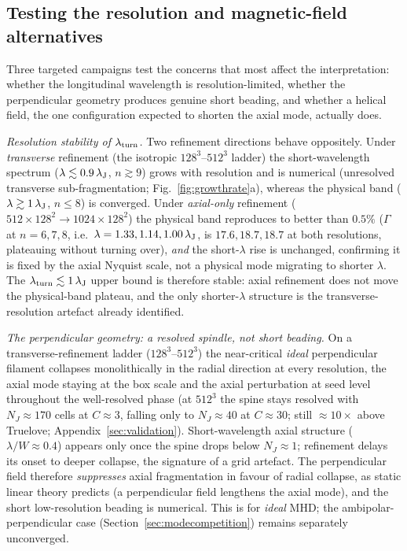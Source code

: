 \documentclass[usenatbib,twoside,twocolumn]{mnras}
\begin{document}
\subsection{Testing the resolution and magnetic-field alternatives}
\label{sec:optional_tests}
Three targeted campaigns test the concerns that most affect the interpretation: whether the longitudinal wavelength is resolution-limited, whether the perpendicular geometry produces genuine short beading, and whether a helical field, the one configuration expected to shorten the axial mode, actually does.

\emph{Resolution stability of $\lambda_{\rm turn}$.} Two refinement directions behave oppositely. Under \emph{transverse} refinement (the isotropic $128^3$--$512^3$ ladder) the short-wavelength spectrum ($\lambda\lesssim0.9\,\lambda_{\rm J}$, $n\gtrsim9$) grows with resolution and is numerical (unresolved transverse sub-fragmentation; Fig.~\ref{fig:growthrate}a), whereas the physical band ($\lambda\gtrsim1\,\lambda_{\rm J}$, $n\leq8$) is converged. Under \emph{axial-only} refinement ($512\times128^2\to1024\times128^2$) the physical band reproduces to better than $0.5\%$ ($\Gamma$ at $n=6,7,8$, i.e.\ $\lambda=1.33,1.14,1.00\,\lambda_{\rm J}$, is $17.6,18.7,18.7$ at both resolutions, plateauing without turning over), \emph{and} the short-$\lambda$ rise is unchanged, confirming it is fixed by the axial Nyquist scale, not a physical mode migrating to shorter $\lambda$. The $\lambda_{\rm turn}\lesssim1\,\lambda_{\rm J}$ upper bound is therefore stable: axial refinement does not move the physical-band plateau, and the only shorter-$\lambda$ structure is the transverse-resolution artefact already identified.

\emph{The perpendicular geometry: a resolved spindle, not short beading.} On a transverse-refinement ladder ($128^3$--$512^3$) the near-critical \emph{ideal} perpendicular filament collapses monolithically in the radial direction at every resolution, the axial mode staying at the box scale and the axial perturbation at seed level throughout the well-resolved phase (at $512^3$ the spine stays resolved with $N_J\approx170$ cells at $C\approx3$, falling only to $N_J\approx40$ at $C\approx30$; still $\approx10\times$ above Truelove; Appendix~\ref{sec:validation}). Short-wavelength axial structure ($\lambda/W\approx0.4$) appears only once the spine drops below $N_J\approx1$; refinement delays its onset to deeper collapse, the signature of a grid artefact. The perpendicular field therefore \emph{suppresses} axial fragmentation in favour of radial collapse, as static linear theory predicts (a perpendicular field lengthens the axial mode), and the short low-resolution beading is numerical. This is for \emph{ideal} MHD; the ambipolar-perpendicular case (Section~\ref{sec:modecompetition}) remains separately unconverged.
\end{document}
